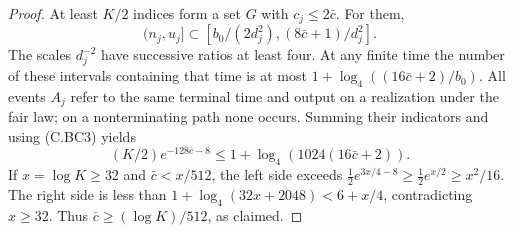 \begin{proof}
At least $K/2$ indices form a set $G$ with $c_j\le2\bar c$. For them,
\[
 (n_j,u_j]\subset
 [b_0/(2d_j^2),(8\bar c+1)/d_j^2].
\]
The scales $d_j^{-2}$ have successive ratios at least four. At any finite
time the number of these intervals containing that time is at most
$1+\log_4((16\bar c+2)/b_0)$. All events $A_j$ refer to the same terminal
time and output on a realization under the fair law; on a nonterminating
path none occurs. Summing their indicators and using (C.BC3) yields
\[
 (K/2)e^{-128\bar c-8}
        \le1+\log_4(1024(16\bar c+2)).                  \tag{C.BC4}
\]
If $x=\log K\ge32$ and $\bar c<x/512$, the left side exceeds
$\tfrac12e^{3x/4-8}\ge\tfrac12e^{x/2}\ge x^2/16$.
The right side is less than
$1+\log_4(32x+2048)<6+x/4$, contradicting $x\ge32$.
Thus $\bar c\ge(\log K)/512$, as claimed.
\end{proof}

